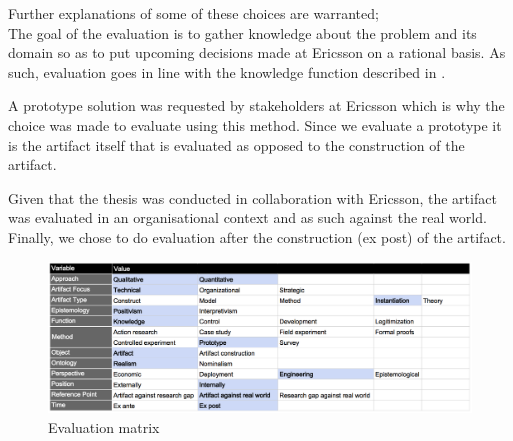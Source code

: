 Further explanations of some of these choices are warranted;\\
The goal of the evaluation is to gather knowledge about the problem and its domain so as to put upcoming decisions made at Ericsson on a rational basis. As such, evaluation goes in line with the knowledge function described in \cite{DesignEval}.

A prototype solution was requested by stakeholders at Ericsson which is why the choice was made to evaluate using this method. Since we evaluate a prototype it is the artifact itself that is evaluated as opposed to the construction of the artifact.

Given that the thesis was conducted in collaboration with Ericsson, the artifact was evaluated in an organisational context and as such against the real world. Finally, we chose to do evaluation after the construction (ex post) of the artifact.

\begin{figure}[h!]
\centering
\includegraphics[width=0.7\pdfpagewidth]{figure/eval.png}
\caption{Evaluation matrix}
\label{fig:matrix}
\end{figure}


%
%
%
%
%

